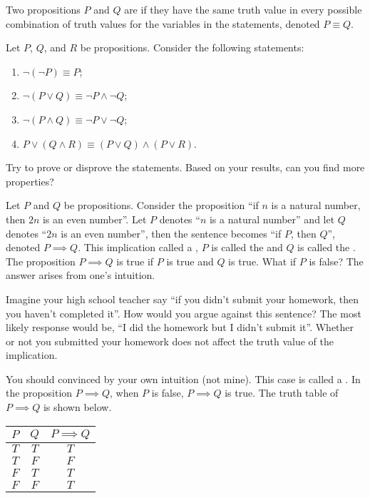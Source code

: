 \documentclass[10pt]{article}
\begin{document}
\par
Two propositions $P$ and $Q$ are  if they have the same truth value in every possible combination of truth values for the variables in the statements, denoted $P\equiv Q$.
\begin{example}
    Let $P$, $Q$, and $R$ be propositions. Consider the following statements:
    \begin{enumerate}
        \item $\neg(\neg P)\equiv P$;
        \item $\neg(P\vee Q)\equiv\neg P\wedge\neg Q$;
        \item $\neg(P\wedge Q)\equiv\neg P\vee\neg Q$;
        \item $P\vee(Q\wedge R)\equiv(P\vee Q)\wedge(P\vee R)$.
    \end{enumerate}
    Try to prove or disprove the statements. Based on your results, can you find more properties?
\end{example}
\par
Let $P$ and $Q$ be propositions. Consider the proposition ``if $n$ is a natural number, then $2n$ is an even number''. Let $P$ denotes ``$n$ is a natural number'' and let $Q$ denotes ``$2n$ is an even number'', then the sentence becomes ``if $P$, then $Q$'', denoted $P\implies Q$. This implication called a , $P$ is called the  and $Q$ is called the . The proposition $P\implies Q$ is true if $P$ is true and $Q$ is true. What if $P$ is false? The answer arises from one's intuition.
\begin{example}
    Imagine your high school teacher say ``if you didn't submit your homework, then you haven't completed it''. How would you argue against this sentence? The most likely response would be, ``I did the homework but I didn't submit it''. Whether or not you submitted your homework does not affect the truth value of the implication.
\end{example}
\par
You should convinced by your own intuition (not mine). This case is called a . In the proposition $P\implies Q$, when $P$ is false, $P\implies Q$ is true. The truth table of $P\implies Q$ is shown below.
\begin{center}
    \begin{tabular}{cc|c}
        $P$ & $Q$ & $P\implies Q$ \\
        \hline
        $T$ & $T$ & $T$ \\
        $T$ & $F$ & $F$ \\
        $F$ & $T$ & $T$ \\
        $F$ & $F$ & $T$
    \end{tabular}
\end{center}
\end{document}
